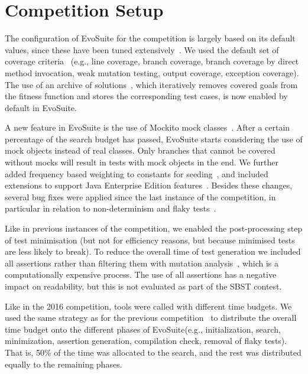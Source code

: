 \documentclass[10pt,conference]{IEEEtran}
\newcommand{\EVOSUITE}{{\sc EvoSuite}\xspace}
\begin{document}
\section{Competition Setup}

The configuration of \EVOSUITE for the competition is largely based on
its default values, since these have been tuned
extensively~\cite{arcuri2013parameter}. We used the default set of
coverage criteria~\cite{rojas2015combining} (e.g., line coverage,
branch coverage, branch coverage by direct method invocation, weak
mutation testing, output coverage, exception coverage). The use of an
archive of solutions~\cite{emse_archive}, which iteratively removes
covered goals from the fitness function and stores the corresponding
test cases, is now enabled by default in \EVOSUITE.

A new feature in \EVOSUITE is the use of Mockito mock
classes~\cite{ICST_Mocking17}. After a certain percentage of the
search budget has passed, \EVOSUITE starts considering the use of mock
objects instead of real classes. Only branches that cannot be covered
without mocks will result in tests with mock objects in the end. We
further added frequency based weighting to constants for
seeding~\cite{sakti2015instance}, and included extensions to support
Java Enterprise Edition features~\cite{arcuri2016java}. Besides these
changes, several bug fixes were applied since the last instance of the
competition, in particular in relation to non-determinism and flaky
tests~\cite{arcuri2014automated}.

Like in previous instances of the competition, we enabled the
post-processing step of test minimisation (but not for efficiency
reasons, but because minimised tests are less likely to break). To
reduce the overall time of test generation we included all assertions
rather than filtering them with mutation
analysis~\cite{10.1109/TSE.2011.93}, which is a computationally
expensive process. The use of all assertions has a negative impact on
readability, but this is not evaluated as part of the SBST contest.

Like in the 2016 competition, tools were called with different time
budgets. We used the same strategy as for the previous
competition~\cite{evosuiteAtSbst2016} to distribute the overall time
budget onto the different phases of \EVOSUITE (e.g., initialization,
search, minimization, assertion generation, compilation check, removal
of flaky tests). That is, 50\% of the time was allocated to the
search, and the rest was distributed equally to the remaining
phases.
\end{document}
